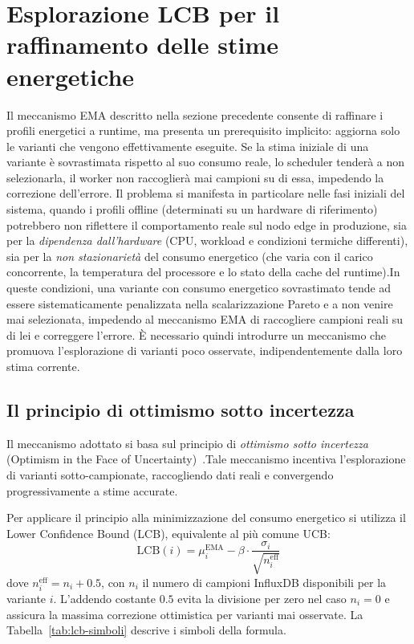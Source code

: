 \section{Esplorazione LCB per il raffinamento delle stime energetiche}
\label{sec:esplorazione-ucb}
 
Il meccanismo EMA descritto nella sezione precedente consente di
raffinare i profili energetici a runtime, ma presenta un prerequisito
implicito: aggiorna solo le varianti che vengono effettivamente
eseguite. Se la stima iniziale di una variante è sovrastimata rispetto
al suo consumo reale, lo scheduler tenderà a non selezionarla, il
worker non raccoglierà mai campioni su di essa, impedendo la correzione dell'errore. Il problema si 
manifesta in particolare
nelle fasi iniziali del sistema, quando i profili offline (determinati
su un hardware di riferimento) potrebbero non riflettere il
comportamento reale sul nodo edge in produzione, sia per la
\emph{dipendenza dall'hardware} (CPU, workload e condizioni termiche
differenti), sia per la \emph{non stazionarietà} del consumo energetico
(che varia con il carico concorrente, la temperatura del processore e
lo stato della cache del runtime).In queste condizioni, una variante con consumo energetico sovrastimato
tende ad essere sistematicamente penalizzata nella scalarizzazione
Pareto e a non venire mai selezionata, impedendo al meccanismo EMA
di raccogliere campioni reali su di lei e correggere l'errore. È
necessario quindi introdurre un meccanismo che promuova l'esplorazione
di varianti poco osservate, indipendentemente dalla loro stima corrente.
 
\subsection{Il principio di ottimismo sotto incertezza}
\label{subsec:ucb-principio}
 
Il meccanismo adottato si basa sul principio di \emph{ottimismo sotto
incertezza} (Optimism in the Face of Uncertainty)~\cite{auer2002finite}.Tale meccanismo incentiva
l'esplorazione di varianti sotto-campionate, raccogliendo dati reali e
convergendo progressivamente a stime accurate.
 
Per applicare il principio alla minimizzazione del consumo energetico si
utilizza il Lower Confidence Bound (LCB), equivalente al più comune UCB:
\begin{equation}
    \mathrm{LCB}(i) = \mu_i^\text{EMA}
        - \beta \cdot \frac{\sigma_i}{\sqrt{n_i^\text{eff}}}
    \label{eq:lcb}
\end{equation}
dove $n_i^\text{eff} = n_i + 0.5$, con $n_i$ il numero di campioni
InfluxDB disponibili per la variante $i$. L'addendo costante $0.5$
evita la divisione per zero nel caso $n_i = 0$ e assicura la massima
correzione ottimistica per varianti mai osservate. La
Tabella~\ref{tab:lcb-simboli} descrive i simboli della formula.
 
